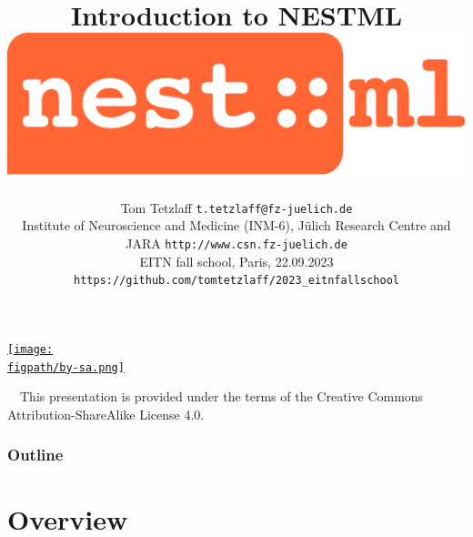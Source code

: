 \documentclass[8pt,t,usepdftitle=false]{beamer}
\title{%
  {\LARGE\bf Introduction to NESTML}
  \hfill\includegraphics[width=0.15\linewidth]{./figures/nestml-logo}\\[1ex]
}
\subtitle{%
  {\normalsize\mdseries Tom Tetzlaff}%
  {\hfill\tiny\texttt{t.tetzlaff@fz-juelich.de}}\\  
  {\footnotesize\mdseries Institute of Neuroscience and Medicine (INM-6), J\"ulich Research Centre and JARA}
  {\hfill\tiny\texttt{http://www.csn.fz-juelich.de}}
  \\
  {\tiny\mdseries EITN fall school, Paris, 22.09.2023}
  {\hfill\tiny\texttt{https://github.com/tomtetzlaff/2023\_eitnfallschool}}
}
\date{}
\author{}
\institute{}
\def\figpath{./figures}
\begin{document}
\maketitle

\begin{frame}[plain]
  \begin{center}
    \parbox{0.9\linewidth}{
      \vspace{0.95\textheight}
      \parbox[c]{0.1\linewidth}{%
        \href{https://creativecommons.org/licenses/by-sa/4.0}{%
          \texttt{[image: \\figpath/by-sa.png]}}}
      \parbox[c]{0.9\linewidth}{\scriptsize%
        ~~{}This presentation is provided under the terms of the Creative Commons Attribution-ShareAlike License 4.0.
      }
    }    
  \end{center}
\end{frame}
\def\ttl{Outline}
\begin{frame}[plain]
  \frametitle{\ttl}
  \tableofcontents
\end{frame}
\def\ttl{Overview}\section{\ttl}
\end{document}
